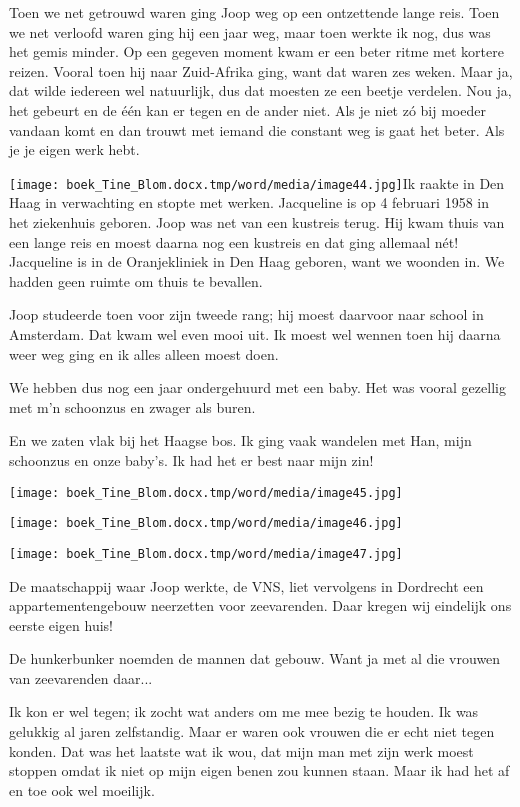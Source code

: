 \documentclass{scrbook}
\begin{document}
{Toen we net getrouwd waren ging Joop weg op een ontzettende lange reis. Toen we net verloofd waren ging hij een jaar weg, maar toen werkte ik nog, dus was het gemis minder. Op een gegeven moment kwam er een beter ritme met kortere reizen. Vooral toen hij naar Zuid-Afrika ging, want dat waren zes weken. Maar ja, dat wilde iedereen wel natuurlijk, dus dat moesten ze een beetje verdelen. Nou ja, het gebeurt en de \'{e}\'{e}n kan er tegen en de ander niet. Als je niet z\'{o} bij moeder vandaan komt en dan trouwt met iemand die constant weg is gaat het beter. Als je je eigen werk hebt.

\texttt{[image: boek\_Tine\_Blom.docx.tmp/word/media/image44.jpg]}Ik raakte in Den Haag in verwachting en stopte met werken. Jacqueline is op 4 februari 1958 in het ziekenhuis geboren. Joop was net van een kustreis terug. Hij kwam thuis van een lange reis en moest daarna nog een kustreis en dat ging allemaal n\'{e}t! Jacqueline is in de Oranjekliniek in Den Haag geboren, want we woonden in. We hadden geen ruimte om thuis te bevallen.

Joop studeerde toen voor zijn tweede rang; hij moest daarvoor naar school in Amsterdam. Dat kwam wel even mooi uit. Ik moest wel wennen toen hij daarna weer weg ging en ik alles alleen moest doen.

We hebben dus nog een jaar ondergehuurd met een baby. Het was vooral gezellig met m’n schoonzus en zwager als buren. 

En we zaten vlak bij het Haagse bos. Ik ging vaak wandelen met Han, mijn schoonzus en onze baby’s. Ik had het er best naar mijn zin!

\texttt{[image: boek\_Tine\_Blom.docx.tmp/word/media/image45.jpg]}

\texttt{[image: boek\_Tine\_Blom.docx.tmp/word/media/image46.jpg]}  

\texttt{[image: boek\_Tine\_Blom.docx.tmp/word/media/image47.jpg]}

De maatschappij waar Joop werkte, de VNS, liet vervolgens in Dordrecht een appartementengebouw neerzetten voor zeevarenden. Daar kregen wij eindelijk ons eerste eigen huis! 

De hunkerbunker noemden de mannen dat gebouw. Want ja met al die vrouwen van zeevarenden daar...

Ik kon er wel tegen; ik zocht wat anders om me mee bezig te houden. Ik was gelukkig al jaren zelfstandig. Maar er waren ook vrouwen die er echt niet tegen konden. Dat was het laatste wat ik wou, dat mijn man met zijn werk moest stoppen omdat ik niet op mijn eigen benen zou kunnen staan. Maar ik had het af en toe ook wel moeilijk.

}
\end{document}
